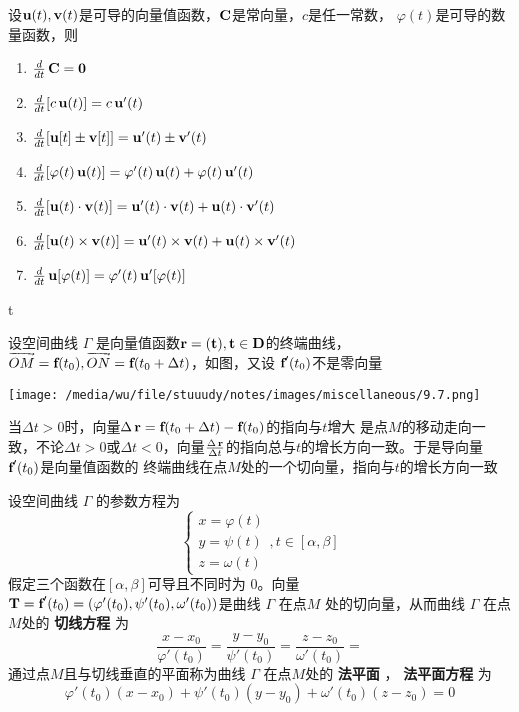 \documentclass[11pt]{article}
\begin{document}
设\(\operatorname{\textbf{u}}(t),\operatorname{\textbf{v}}(t)\)是可导的向量值函数，\(\operatorname{\textbf{C}}\)是常向量，\(c\)是任一常数，
\(\varphi(t)\)是可导的数量函数，则
\begin{enumerate}
\item \(\frac{d}{dt}\operatorname{\textbf{C}}=\mathbf{0}\)
\item \(\frac{d}{dt}[c\operatorname{\textbf{u}}(t)]=c\operatorname{\textbf{u}}'(t)\)
\item \(\frac{d}{dt}[\operatorname{\textbf{u}}[t]\pm\operatorname{\textbf{v}}[t]]=\operatorname{\textbf{u}}'(t)\pm\operatorname{\textbf{v}}'(t)\)
\item \(\frac{d}{dt}[\varphi(t)\operatorname{\textbf{u}}(t)]=\varphi'(t)\operatorname{\textbf{u}}(t)+\varphi(t)\operatorname{\textbf{u}}'(t)\)
\item \(\frac{d}{dt}[\operatorname{\textbf{u}}(t)\cdot\operatorname{\textbf{v}}(t)]=\operatorname{\textbf{u}}'(t)\cdot\operatorname{\textbf{v}}(t)+\operatorname{\textbf{u}}(t)\cdot\operatorname{\textbf{v}}'(t)\)
\item \(\frac{d}{dt}[\operatorname{\textbf{u}}(t)\times\operatorname{\textbf{v}}(t)]=\operatorname{\textbf{u}}'(t)\times\operatorname{\textbf{v}}(t)+\operatorname{\textbf{u}}(t)\times\operatorname{\textbf{v}}'(t)\)
\item \(\frac{d}{dt}\operatorname{\textbf{u}}[\varphi(t)]=\varphi'(t)\operatorname{\textbf{u}}'[\varphi(t)]\)
\end{enumerate}

t

设空间曲线 \(\Gamma\) 是向量值函数\(\operatorname{\textbf{r}}=\bf(t),t\in D\)的终端曲线，
\(\vect{OM}=\bff(t_0),\vect{ON}=\bff(t_0+\Delta t)\)，如图，又设
\(\operatorname{\textbf{f}}'(t_0)\)不是零向量

\begin{center}
\texttt{[image: /media/wu/file/stuuudy/notes/images/miscellaneous/9.7.png]}
\end{center}

当\(\Delta t>0\)时，向量\(\Delta \operatorname{\textbf{r}}=\operatorname{\textbf{f}}(t_0+\Delta t)-\operatorname{\textbf{f}}(t_0)\)的指向与\(t\)增大
是点\(M\)的移动走向一致，不论\(\Delta t>0\)或\(\Delta t<0\)，向量\(\frac{\Delta \operatorname{\textbf{r}}}{\Delta
      t}\)的指向总与\(t\)的增长方向一致。于是导向量\(\operatorname{\textbf{f}}'(t_0)\)是向量值函数的
   终端曲线在点\(M\)处的一个切向量，指向与\(t\)的增长方向一致


设空间曲线 \(\Gamma\) 的参数方程为
\begin{equation*}
\begin{cases}
x=\varphi(t)\\
y=\psi(t)\\
z=\omega(t)
\end{cases},t\in[\alpha,\beta]
\end{equation*}
假定三个函数在\([\alpha,\beta]\)可导且不同时为 0。向量
\(\operatorname{\textbf{T}}=\operatorname{\textbf{f}}'(t_0)=(\varphi'(t_0),\psi'(t_0),\omega'(t_0))\)是曲线 \(\Gamma\) 在点\(M\)
处的切向量，从而曲线 \(\Gamma\) 在点\(M\)处的 \textbf{切线方程} 为
\begin{equation*}
\frac{x-x_0}{\varphi'(t_0)}=
\frac{y-y_0}{\psi'(t_0)}=
\frac{z-z_0}{\omega'(t_0)}=
\end{equation*}
通过点\(M\)且与切线垂直的平面称为曲线 \(\Gamma\) 在点\(M\)处的 \textbf{法平面} ， \textbf{法平面方程} 为
\begin{equation*}
\varphi'(t_0)(x-x_0)+\psi'(t_0)(y-y_0)+\omega'(t_0)(z-z_0)=0
\end{equation*}
\end{document}
